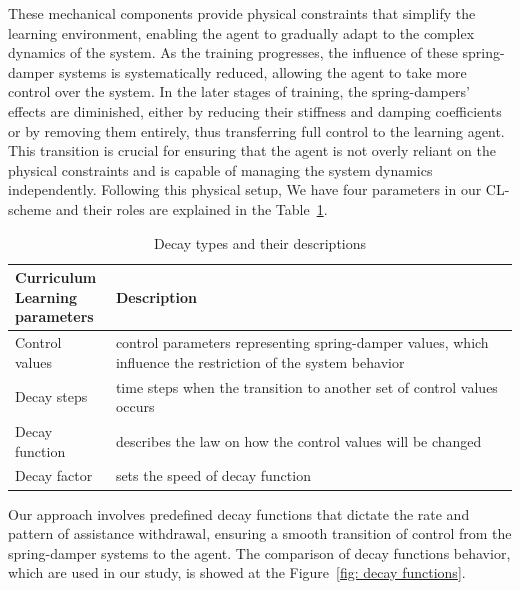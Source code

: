 These mechanical components provide physical constraints that simplify the learning environment, enabling the agent to gradually adapt to the complex dynamics of the system. As the training progresses, the influence of these spring-damper systems is systematically reduced, allowing the agent to take more control over the system. In the later stages of training, the spring-dampers' effects are diminished, either by reducing their stiffness and damping coefficients or by removing them entirely, thus transferring full control to the learning agent. This transition is crucial for ensuring that the agent is not overly reliant on the physical constraints and is capable of managing the system dynamics independently.
Following this physical setup, We have four parameters in our CL-scheme and their roles are explained in the Table~\ref{table: decay types}. 

\begin{table}[h]
	\caption{Decay types and their descriptions}
	\centering
	\begin{tabular}{l|p{}}
		\toprule
		\makecell{\textbf{Curriculum}\\ \textbf{Learning}\\ \textbf{parameters}} & \textbf{Description} \\ \midrule
		Control values & control parameters representing spring-damper values, which influence the restriction of the system behavior\\ \hline 
		Decay steps & time steps when the transition to another set of control values occurs\\ \hline 
		Decay function & describes the law on how the control values will be changed\\ \hline
		Decay factor & sets the speed of decay function\\ 
		\bottomrule
	\end{tabular}
	\label{table: decay types}
\end{table}

Our approach involves predefined decay functions that dictate the rate and pattern of assistance withdrawal, ensuring a smooth transition of control from the spring-damper systems to the agent. The comparison of decay functions behavior, which are used in our study, is showed at the Figure~\ref{fig: decay functions}.

